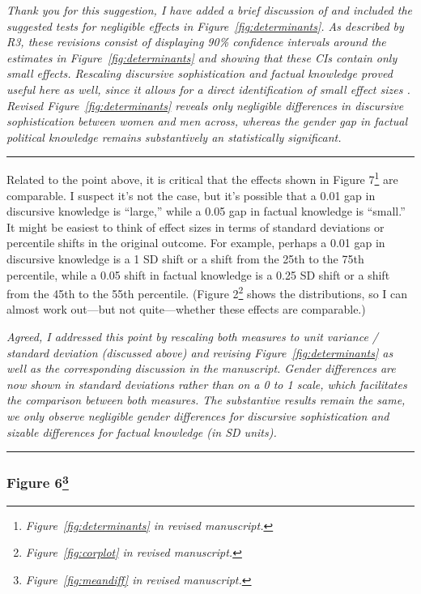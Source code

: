 \textit{Thank you for this suggestion, I have added a brief discussion of \citep{rainey2014arguing} and included the suggested tests for negligible effects in Figure~\ref{fig:determinants}. As described by R3, these revisions consist of displaying 90\% confidence intervals around the estimates in Figure~\ref{fig:determinants} and showing that these CIs contain only small effects. Rescaling discursive sophistication and factual knowledge proved useful here as well, since it allows for a direct identification of small effect sizes \citep[equivalent to Cohen's $d \leq 0.2$; see][]{sawilowsky2009new}. Revised Figure~\ref{fig:determinants} reveals only negligible differences in discursive sophistication between women and men across, whereas the gender gap in factual political knowledge remains substantively an statistically significant.}


\rule{\linewidth}{.01cm}

Related to the point above, it is critical that the effects shown in Figure 7\footnote{\textit{Figure~\ref{fig:determinants} in revised manuscript.}} are comparable. I suspect it’s not the case, but it’s possible that a 0.01 gap in discursive knowledge is ``large,'' while a 0.05 gap in factual knowledge is ``small.'' It might be easiest to think of effect sizes in terms of standard deviations or percentile shifts in the original outcome. For example, perhaps a 0.01 gap in discursive knowledge is a 1 SD shift or a shift from the 25th to the 75th percentile, while a 0.05 shift in factual knowledge is a 0.25 SD shift or a shift from the 45th to the 55th percentile. (Figure 2\footnote{\textit{Figure~\ref{fig:corplot} in revised manuscript.}} shows the distributions, so I can almost work out—but not quite—whether these effects are comparable.)

\textit{Agreed, I addressed this point by rescaling both measures to unit variance / standard deviation (discussed above) and revising Figure~\ref{fig:determinants} as well as the corresponding discussion in the manuscript. Gender differences are now shown in standard deviations rather than on a 0 to 1 scale, which facilitates the comparison between both measures. The substantive results remain the same, we only observe negligible gender differences for discursive sophistication and sizable differences for factual knowledge (in SD units).}


\rule{\linewidth}{.01cm}


\subsubsection*{Figure 6\footnote{\textit{Figure~\ref{fig:meandiff} in revised manuscript.}}}

